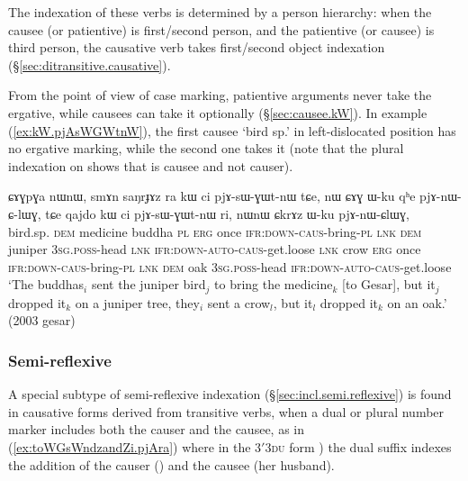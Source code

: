 The indexation of these verbs is determined by a person hierarchy: when the causee (or patientive) is first/second person, and the patientive (or causee)  is third person, the causative verb takes first/second object indexation (§\ref{sec:ditransitive.causative}).

From the point of view of case marking, patientive arguments never take the ergative, while causees can take it optionally (§\ref{sec:causee.kW}). In example  (\ref{ex:kW.pjAsWGWtnW}), the first causee  `bird sp.' in left-dislocated position has no ergative marking, while the second one  takes it (note that the plural indexation on  shows that  is causee and not causer).
 
\begin{exe}
\ex \label{ex:kW.pjAsWGWtnW}
\gll ɕɤɣpɣa nɯnɯ, smɤn saŋrɟɤz ra kɯ ci pjɤ-sɯ-ɣɯt-nɯ tɕe, nɯ ɕɤɣ ɯ-ku qʰe pjɤ-nɯ-ɕ-lɯɣ, tɕe qajdo kɯ ci pjɤ-sɯ-ɣɯt-nɯ ri, nɯnɯ ɕkrɤz ɯ-ku pjɤ-nɯ-ɕlɯɣ, \\
bird.sp. \textsc{dem} medicine buddha \textsc{pl} \textsc{erg} once \textsc{ifr}:\textsc{down}-\textsc{caus}-bring-\textsc{pl} \textsc{lnk} \textsc{dem} juniper \textsc{3sg}.\textsc{poss}-head \textsc{lnk} \textsc{ifr}:\textsc{down}-\textsc{auto}-\textsc{caus}-get.loose \textsc{lnk} crow \textsc{erg} once \textsc{ifr}:\textsc{down}-\textsc{caus}-bring-\textsc{pl} \textsc{lnk} \textsc{dem} oak \textsc{3sg}.\textsc{poss}-head  \textsc{ifr}:\textsc{down}-\textsc{auto}-\textsc{caus}-get.loose  \\
\glt `The buddhas$_i$ sent the juniper bird$_j$ to bring the medicine$_k$ [to Gesar], but it$_j$  dropped it$_k$ on a juniper tree, they$_i$ sent a crow$_l$, but it$_l$ dropped it$_k$ on an oak.' (2003 gesar)
\end{exe}

\subsubsection{Semi-reflexive} \label{sec:sig.caus.semi.reflexive}
A special subtype of semi-reflexive indexation (§\ref{sec:incl.semi.reflexive}) is found in causative forms derived from transitive verbs, when a dual or plural number marker includes both the causer and the causee, as in (\ref{ex:toWGsWndzandZi.pjAra}) where in the 3$'$\fl{}\textsc{3du} form ) the dual suffix indexes the addition of the causer () and the causee (her husband).

